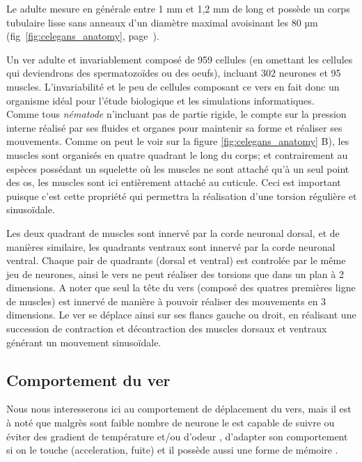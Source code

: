 Le \celeg{} adulte mesure en générale entre 1 mm et 1,2 mm de long et
possède un corps tubulaire lisse sans anneaux d'un diamètre maximal
avoisinant les 80 µm (fig~\ref{fig:celegans_anatomy},
page~\pageref{fig:celegans_anatomy}).

Un ver adulte et invariablement composé de 959 cellules (en omettant les
cellules qui deviendrons des spermatozoïdes ou des oeufs), incluant 302
neurones et 95 muscles.  \cite{Boyle2009} L'invariabilité et le peu de
cellules composant ce vers en fait donc un organisme idéal pour l'étude
biologique et les simulations informatiques.\\


Comme tous \textit{nématode} n'incluant pas de partie rigide, le \celeg{}
compte sur la pression interne réalisé par ses fluides et organes pour
maintenir sa forme et réaliser ses mouvements.  Comme on peut le voir sur la
figure \ref{fig:celegans_anatomy} B), les muscles sont organisés en quatre
quadrant le long du corps; et contrairement au espèces possédant un
squelette où les muscles ne sont attaché qu'à un seul point des os, les
muscles sont ici entièrement attaché au cuticule. Ceci est important puisque
c'est cette propriété qui permettra la réalisation d'une torsion régulière
et sinusoïdale.

Les deux quadrant de muscles sont innervé par la corde neuronal dorsal, et de
manières similaire, les quadrants ventraux sont innervé par la corde neuronal
ventral. Chaque pair de quadrants (dorsal et ventral) est controlée par le même
jeu de neurones, ainsi le vers ne peut réaliser des torsions que dans un plan à
2 dimensions. A noter que seul la tête du vers (composé des quatres premières
ligne de muscles) est innervé de manière à pouvoir réaliser des mouvements en 3
dimensions. Le ver se déplace ainsi sur ses flancs gauche ou droit, en réalisant
une succession de contraction et décontraction des muscles dorsaux et ventraux
générant un mouvement sinusoïdale.


\subsection{Comportement du ver} %
\label{sub:Comportement du ver}

Nous nous interesserons ici au comportement de déplacement du vers, mais il est
à noté que malgrès sont faible nombre de neurone le \celeg{} est capable de
suivre ou éviter des gradient de température et/ou d'odeur
\cite{Ferree1999,Gray2005}, d'adapter son comportement si on le touche
(acceleration, fuite) \cite{Chalfie1985} et il possède aussi une forme de
mémoire \cite{Rankin2005a}.\\

